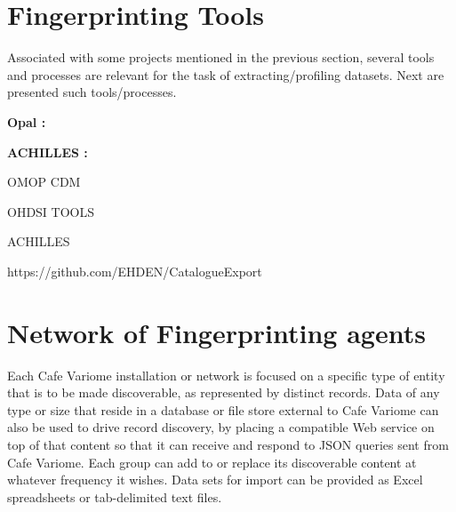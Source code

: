 \section{Fingerprinting Tools}

Associated with some projects mentioned in the previous section, several tools and
processes are relevant for the task of extracting/profiling datasets.
Next are presented such tools/processes.

\textbf{Opal \cite{mica}:}
\cite{mica}

\textbf{ACHILLES \cite{mica}:}

OMOP CDM

OHDSI TOOLS 

ACHILLES

https://github.com/EHDEN/CatalogueExport

%
%
%
%
%
%
%
%
%

\section{Network of Fingerprinting agents}
\cite{cafevariome}
Each Cafe Variome installation or network is focused on a specific type of entity that
is to be made discoverable, as represented by distinct records. Data of
any type or size that reside in a database or file store external to Cafe Variome can
also be used to drive record discovery, by placing a compatible Web service on top of
that content so that it can receive and respond to JSON queries sent from Cafe Variome.
Each group can add to or replace its discoverable content at whatever frequency it
wishes. Data sets for import can be provided as Excel spreadsheets or tab-delimited text files.


